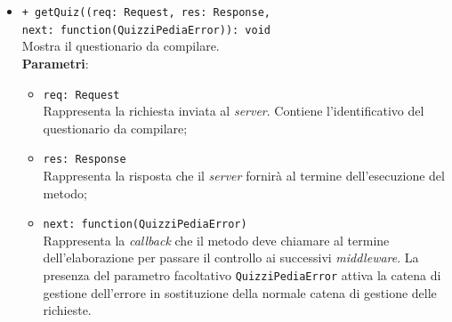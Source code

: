 \begin{itemize}
\begin{itemize}
			\item \texttt{+ getQuiz((req: Request, res: Response, \\next: function(QuizziPediaError)): void}\\
			Mostra il questionario da compilare.\\
			\textbf{Parametri}:
			\begin{itemize}
				\item \texttt{req: Request}\\
			Rappresenta la richiesta inviata al \textit{server}. Contiene l'identificativo del questionario da compilare;
				\item \texttt{res: Response}\\
			Rappresenta la risposta che il \textit{server} fornirà al termine dell'esecuzione del metodo;
				\item \texttt{next: function(QuizziPediaError)}\\
			Rappresenta la \textit{callback} che il metodo deve chiamare al termine dell'elaborazione per passare il controllo ai successivi \textit{middleware}. La presenza del parametro facoltativo \texttt{QuizziPediaError} attiva la catena di gestione dell'errore in sostituzione della normale catena di gestione delle richieste.
			\end{itemize}
	\end{itemize}		
\end{itemize}